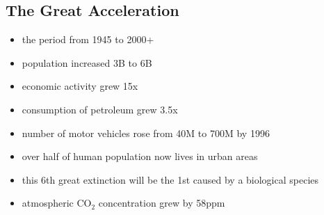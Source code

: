 \subsection{The Great Acceleration}
\begin{itemize}
	\item the period from 1945 to 2000+
	\item population increased 3B to 6B
	\item economic activity grew 15x
	\item consumption of petroleum grew 3.5x
	\item number of motor vehicles rose from 40M to 700M by 1996
	\item over half of human population now lives in urban areas
	\item this 6th great extinction will be the 1st caused by a biological
	species
	\item atmospheric CO$_2$ concentration grew by 58ppm
\end{itemize}

